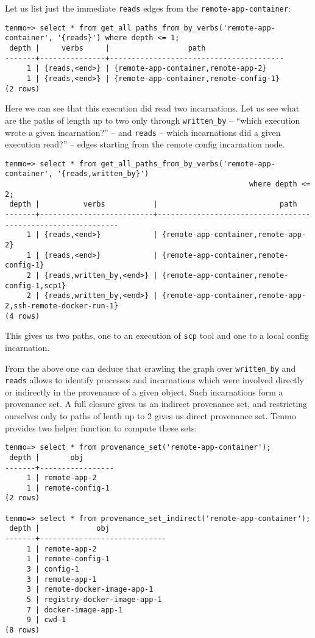 Let us list just the immediate \texttt{reads} edges from the \texttt{remote-app-container}:
%
\begin{verbatim}
tenmo=> select * from get_all_paths_from_by_verbs('remote-app-container', '{reads}') where depth <= 1;
 depth |     verbs     |                  path                  
-------+---------------+----------------------------------------
     1 | {reads,<end>} | {remote-app-container,remote-app-2}
     1 | {reads,<end>} | {remote-app-container,remote-config-1}
(2 rows)
\end{verbatim}
%
Here we can see that this execution did read two incarnations. Let us see what are the paths of length up to two only through \texttt{written\_by} -- ``which execution wrote a given incarnation?'' -- and \texttt{reads} -- which incarnations did a given execution read?'' -- edges starting from the remote config incarnation node.
%
\begin{verbatim}
tenmo=> select * from get_all_paths_from_by_verbs('remote-app-container', '{reads,written_by}')
                                                        where depth <= 2;
 depth |          verbs           |                            path                             
-------+--------------------------+-------------------------------------------------------------
     1 | {reads,<end>}            | {remote-app-container,remote-app-2}
     1 | {reads,<end>}            | {remote-app-container,remote-config-1}
     2 | {reads,written_by,<end>} | {remote-app-container,remote-config-1,scp1}
     2 | {reads,written_by,<end>} | {remote-app-container,remote-app-2,ssh-remote-docker-run-1}
(4 rows)
\end{verbatim}
%
This gives us two paths, one to an execution of \texttt{scp} tool and one to a local config incarnation.

From the above one can deduce that crawling the graph over \texttt{written\_by} and \texttt{reads} allows to identify processes and incarnations which were involved directly or indirectly in the provenance of a given object. Such incarnations form a provenance set. A full closure gives us an indirect provenance set, and restricting ourselves only to paths of lenth up to 2 gives us direct provenance set. Tenmo provides two helper function to compute these sets:
%
\begin{verbatim}
tenmo=> select * from provenance_set('remote-app-container');
 depth |       obj       
-------+-----------------
     1 | remote-app-2
     1 | remote-config-1
(2 rows)

tenmo=> select * from provenance_set_indirect('remote-app-container');
 depth |             obj             
-------+-----------------------------
     1 | remote-app-2
     1 | remote-config-1
     3 | config-1
     3 | remote-app-1
     3 | remote-docker-image-app-1
     5 | registry-docker-image-app-1
     7 | docker-image-app-1
     9 | cwd-1
(8 rows)
\end{verbatim}

